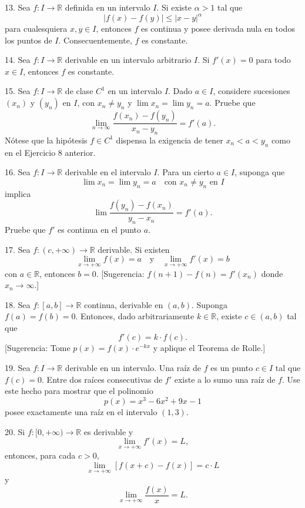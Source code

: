 \documentclass[12pt,oneside]{book}
\begin{document}
13. Sea \( f: I \to \mathbb{R} \) definida en un intervalo \( I \). Si existe \( \alpha > 1 \) tal que
\[
|f(x) - f(y)| \leq |x - y|^\alpha
\]
para cualesquiera \( x, y \in I \), entonces \( f \) es continua y posee derivada nula en todos los puntos de \( I \). Consecuentemente, \( f \) es constante.

14. Sea \( f: I \to \mathbb{R} \) derivable en un intervalo arbitrario \( I \). Si \( f'(x) = 0 \) para todo \( x \in I \), entonces \( f \) es constante.

15. Sea \( f: I \to \mathbb{R} \) de clase \( C^1 \) en un intervalo \( I \). Dado \( a \in I \), considere sucesiones \( (x_n) \) y \( (y_n) \) en \( I \), con \( x_n \neq y_n \) y \( \lim x_n = \lim y_n = a \). Pruebe que
\[
\lim_{n \to \infty} \frac{f(x_n) - f(y_n)}{x_n - y_n} = f'(a).
\]
Nótese que la hipótesis \( f \in C^1 \) dispensa la exigencia de tener \( x_n < a < y_n \) como en el Ejercicio 8 anterior.

16. Sea \( f: I \to \mathbb{R} \) derivable en el intervalo \( I \). Para un cierto \( a \in I \), suponga que
\[
\lim x_n = \lim y_n = a \quad \text{con } x_n \neq y_n \text{ en } I
\]
implica
\[
\lim \frac{f(y_n) - f(x_n)}{y_n - x_n} = f'(a).
\]
Pruebe que \( f' \) es continua en el punto \( a \).

17. Sea \( f: (c, +\infty) \to \mathbb{R} \) derivable. Si existen
\[
\lim_{x \to +\infty} f(x) = a \quad \text{y} \quad \lim_{x \to +\infty} f'(x) = b
\]
con \( a \in \mathbb{R} \), entonces \( b = 0 \).
[Sugerencia: \( f(n+1) - f(n) = f'(x_n) \) donde \( x_n \to \infty \).]

18. Sea \( f: [a, b] \to \mathbb{R} \) continua, derivable en \( (a, b) \). Suponga \( f(a) = f(b) = 0 \). Entonces, dado arbitrariamente \( k \in \mathbb{R} \), existe \( c \in (a, b) \) tal que
\[
f'(c) = k \cdot f(c).
\]
[Sugerencia: Tome \( p(x) = f(x) \cdot e^{-kx} \) y aplique el Teorema de Rolle.]

19. Sea \( f: I \to \mathbb{R} \) derivable en un intervalo. Una raíz de \( f \) es un punto \( c \in I \) tal que \( f(c) = 0 \). Entre dos raíces consecutivas de \( f' \) existe a lo sumo una raíz de \( f \). Use este hecho para mostrar que el polinomio
\[
p(x) = x^3 - 6x^2 + 9x - 1
\]
posee exactamente una raíz en el intervalo \( (1, 3) \).

20. Si \( f: [0, +\infty) \to \mathbb{R} \) es derivable y
\[
\lim_{x \to +\infty} f'(x) = L,
\]
entonces, para cada \( c > 0 \),
\[
\lim_{x \to +\infty} [f(x + c) - f(x)] = c \cdot L
\]
y
\[
\lim_{x \to +\infty} \frac{f(x)}{x} = L.
\]
\end{document}
